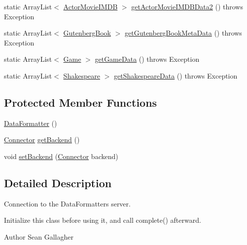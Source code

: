 \begin{DoxyCompactItemize}
\item 
static Array\+List$<$ \hyperlink{classbridges_1_1data__src__dependent_1_1_actor_movie_i_m_d_b}{Actor\+Movie\+I\+M\+DB} $>$ \hyperlink{classbridges_1_1connect_1_1_data_formatter_a9b599616c4d7a502f9fab8663173db6d}{get\+Actor\+Movie\+I\+M\+D\+B\+Data2} ()  throws Exception 
\item 
static Array\+List$<$ \hyperlink{classbridges_1_1data__src__dependent_1_1_gutenberg_book}{Gutenberg\+Book} $>$ \hyperlink{classbridges_1_1connect_1_1_data_formatter_a4bd21bd830238db40b511474afc77b61}{get\+Gutenberg\+Book\+Meta\+Data} ()  throws Exception 
\item 
static Array\+List$<$ \hyperlink{classbridges_1_1data__src__dependent_1_1_game}{Game} $>$ \hyperlink{classbridges_1_1connect_1_1_data_formatter_a4098317468be22b4284156d6cd2212e1}{get\+Game\+Data} ()  throws Exception 
\item 
static Array\+List$<$ \hyperlink{classbridges_1_1data__src__dependent_1_1_shakespeare}{Shakespeare} $>$ \hyperlink{classbridges_1_1connect_1_1_data_formatter_abc1db0f1a9758b5fa97c167cb8fe4052}{get\+Shakespeare\+Data} ()  throws Exception 
\end{DoxyCompactItemize}
\subsection*{Protected Member Functions}
\begin{DoxyCompactItemize}
\item 
\hyperlink{classbridges_1_1connect_1_1_data_formatter_a31efd2251e98942e58e743dff213ef27}{Data\+Formatter} ()
\item 
\hyperlink{classbridges_1_1connect_1_1_connector}{Connector} \hyperlink{classbridges_1_1connect_1_1_data_formatter_a29cf4c2b0c5629d63a76b60569355c65}{get\+Backend} ()
\item 
void \hyperlink{classbridges_1_1connect_1_1_data_formatter_af9b878e5c092234a6ab5f8c11bee1fbd}{set\+Backend} (\hyperlink{classbridges_1_1connect_1_1_connector}{Connector} backend)
\end{DoxyCompactItemize}


\subsection{Detailed Description}
Connection to the Data\+Formatters server.

Initialize this class before using it, and call complete() afterward.

\begin{DoxyAuthor}{Author}
Sean Gallagher 
\end{DoxyAuthor}

